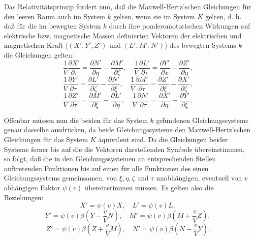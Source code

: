 \documentclass[17pt]{webarticle}       %
\begin{document}
Das Relativitätsprinzip fordert nun, daß die Maxwell-Hertz'schen Gleichungen für den leeren Raum auch im System \( k \) gelten, wenn sie im System \( K \) gelten, d. h. daß für die im bewegten System \( k \) durch ihre ponderomotorischen Wirkungen auf elektrische bzw. magnetische Massen definierten Vektoren der elektrischen und magnetischen Kraft (\((X', Y', Z')\) und \((L', M', N')\)) des bewegten Systems \( k \) die Gleichungen gelten:
\[
\frac{1}{V} \frac{\partial X'}{\partial \tau} = \frac{\partial N'}{\partial \eta} - \frac{\partial M'}{\partial \zeta}, \quad \frac{1}{V} \frac{\partial L'}{\partial \tau} = \frac{\partial Y'}{\partial x} - \frac{\partial Z'}{\partial \eta},
\]
\[
\frac{1}{V} \frac{\partial Y'}{\partial \tau} = \frac{\partial L'}{\partial \zeta} - \frac{\partial N'}{\partial \xi}, \quad \frac{1}{V} \frac{\partial M'}{\partial \tau} = \frac{\partial Z'}{\partial \xi} - \frac{\partial X'}{\partial \zeta},
\]
\[
\frac{1}{V} \frac{\partial Z'}{\partial \tau} = \frac{\partial M'}{\partial \xi} - \frac{\partial L'}{\partial \eta}, \quad \frac{1}{V} \frac{\partial N'}{\partial \tau} = \frac{\partial X'}{\partial \eta} - \frac{\partial Y'}{\partial \xi},
\]

Offenbar müssen nun die beiden für das System \( k \) gefundenen Gleichungssysteme genau dasselbe ausdrücken, da beide Gleichungssysteme den Maxwell-Hertz'schen Gleichungen für das System \( K \) äquivalent sind. Da die Gleichungen beider Systeme ferner bis auf die die Vektoren darstellenden Symbole übereinstimmen, so folgt, daß die in den Gleichungssystemen an entsprechenden Stellen auftretenden Funktionen bis auf einen für alle Funktionen des einen Gleichungssystems gemeinsamen, von \(\xi, \eta, \zeta\) und \(\tau\) unabhängigen, eventuell von \( v \) abhängigen Faktor \(\psi(v)\) übereinstimmen müssen. Es gelten also die Beziehungen:
\[
X' = \psi(v) X, \quad L' = \psi(v) L,
\]
\[
Y' = \psi(v) \beta \left( Y - \frac{v}{V} N \right), \quad M' = \psi(v) \beta \left( M + \frac{v}{V} Z \right),
\]
\[
Z' = \psi(v) \beta \left( Z + \frac{v}{V} M \right), \quad N' = \psi(v) \beta \left( N - \frac{v}{V} Y \right).
\]
\end{document}
